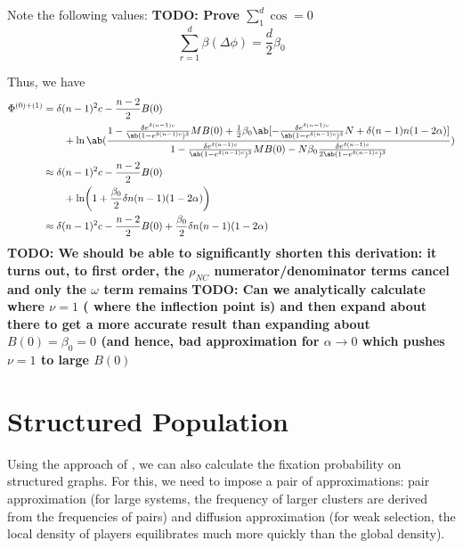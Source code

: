 \documentclass[pdflatex,lineno,referee,sn-mathphys-ay]{sn-jnl}
\begin{document}
Note the following values:
\textbf{TODO: Prove $\sum_1^d \cos = 0$}
\begin{equation}
  \sum_{r=1}^d \beta(\Delta \phi) = \frac{d}{2} \beta_0
\end{equation}

Thus, we have
\begin{equation}
  \begin{aligned}
    \Phi^{(0)+(1)} &=
\delta(n-1)^2 c - \frac{n-2}{2} B(0) \\
  &\qquad +
\ln\ab(
\frac{
1 -
    \frac{\delta e^{\delta(n-1)c}}{\ab(1-e^{\delta (n-1)c})^3}
  M B(0)
+
\frac{1}{2}\beta_0\ab[
-
    \frac{\delta e^{\delta(n-1)c}}{\ab(1-e^{\delta (n-1)c})^3} N
    +
\delta (n-1) n (1 - 2 \alpha)
]
}
{1 -
    \frac{\delta e^{\delta(n-1)c}}{\ab(1-e^{\delta (n-1)c})^3}
  M B(0)
  - N \beta_0 \frac{\delta e^{\delta(n-1)c}}{2\ab(1-e^{\delta (n-1)c})^3}
                  }
  )
  \\
  &\approx
\delta(n-1)^2 c - \frac{n-2}{2} B(0) \\
  &\qquad +
\ln \biggl(
  1 + \frac{\beta_0}{2} \delta n (n-1) (1-2\alpha)
\biggr)
  \\
  &\approx
  \delta(n-1)^2 c - \frac{n-2}{2} B(0) +
  \frac{\beta_0}{2} \delta n (n-1) (1-2\alpha)
\end{aligned}
\label{eq:analytic_first_term}
\end{equation}
\textbf{TODO: We should be able to significantly shorten this
  derivation: it turns out, to first order, the $\rho_{NC}$
  numerator/denominator terms cancel and only the $\omega$ term remains}
\textbf{TODO: Can we analytically calculate where $\nu = 1$ (\ie{} where
  the inflection point is) and then expand about there to get a more
  accurate result than expanding about $B(0) = \beta_0 = 0$ (and hence,
  bad approximation for $\alpha \to 0$ which pushes $\nu=1$ to large
  $B(0)$}

\section{Structured Population}
Using the approach of \citet{ohtsuki2006simple},
we can also calculate the fixation probability
on structured graphs.
For this, we need to impose a pair of approximations:
pair approximation
(for large systems,
the frequency of larger clusters are derived from the frequencies of pairs)
and diffusion approximation
(for weak selection, the local density of players equilibrates
much more quickly than the global density).
\end{document}
